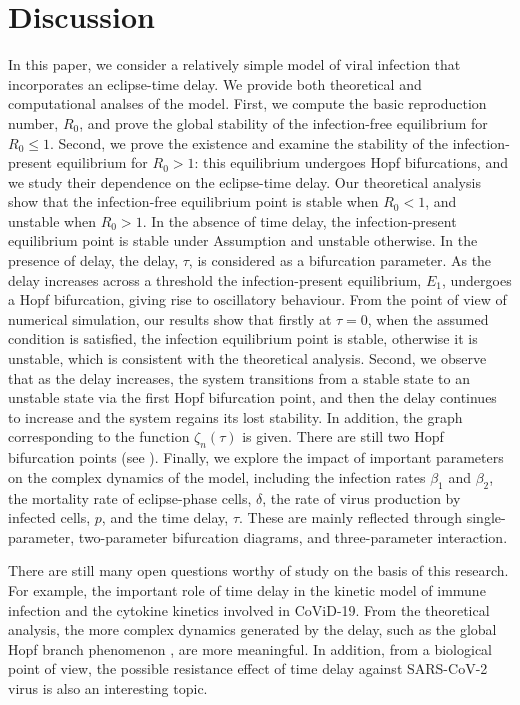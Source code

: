 \documentclass{CMHPhD-SIVD}
\begin{document}
\section{Discussion} \label{sec5}
In this paper, we consider a relatively simple model of viral infection that incorporates an eclipse-time delay.  We provide both theoretical and computational analses of the model. First, we compute the basic reproduction number, $R_0$, and prove the global stability of the infection-free equilibrium for $R_0\leq 1$. Second, we prove the existence and examine the stability of the infection-present equilibrium for $R_0>1$: this equilibrium undergoes Hopf bifurcations, and we study their dependence on the eclipse-time delay. 
Our theoretical analysis show that the infection-free equilibrium point is stable when $R_0 < 1$, and unstable when $R_0 > 1$.
In the absence of time delay, the infection-present equilibrium point is stable under Assumption  and unstable otherwise. 
In the presence of delay, the delay, $\tau$, is considered as a bifurcation parameter.  As the delay increases across a threshold the infection-present equilibrium, $E_1$, undergoes a Hopf bifurcation, giving rise to oscillatory behaviour.
From the point of view of numerical simulation, our results show that firstly at $\tau=0$, when the assumed condition is satisfied, the infection equilibrium point is stable, otherwise it is unstable, which is consistent with the theoretical analysis. 
Second, we observe that as the delay increases, the system transitions from a stable state to an unstable state via the first Hopf bifurcation point, and then the delay continues to increase and the system regains its lost stability. In addition, the graph corresponding to the function $\zeta_n(\tau)$ is given. There are still two Hopf bifurcation points (see ). Finally, we explore the impact of important parameters on the complex dynamics of the model,  including the infection rates $\beta_1$ and $\beta_2$, the mortality rate of eclipse-phase cells, $\delta$, the rate of virus production by infected cells, $p$, and the time delay, $\tau$. These are mainly reflected through single-parameter, two-parameter bifurcation diagrams, and three-parameter interaction.

There are still many open questions worthy of study on the basis of this research. For example, the important role of time delay in the kinetic model of immune infection and the cytokine kinetics involved in CoViD-19. From the theoretical analysis, the more complex dynamics generated by the delay, such as the global Hopf branch phenomenon \cite{shu2020complex,jiang2016global}, are more meaningful. In addition, from a biological point of view, the possible resistance effect of time delay against SARS-CoV-2 virus is also an interesting topic.
\end{document}
